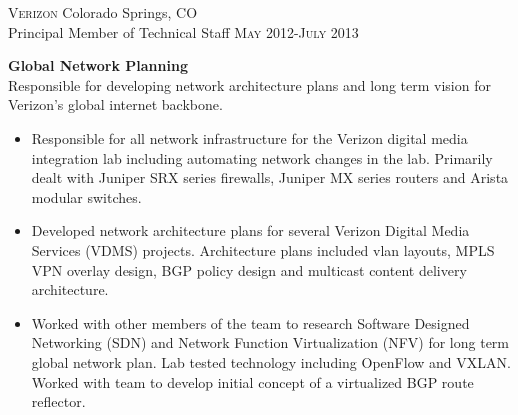 
\textsc{Verizon} \hfill Colorado Springs, CO\\
Principal Member of Technical Staff \hfill \textsc{May 2012-July 2013}

\textbf{Global Network Planning}\\
Responsible for developing network architecture plans and long term
vision for Verizon’s global internet backbone.

\begin{itemize}
\item
Responsible for all network infrastructure for the Verizon digital media
integration lab including automating network changes in the lab.  Primarily
dealt with Juniper SRX series firewalls, Juniper MX series routers and
Arista modular switches.

\item
Developed network architecture plans for several Verizon Digital Media Services
(VDMS) projects.  Architecture plans included vlan layouts, MPLS VPN overlay
design, BGP policy design and multicast content delivery architecture.

\item
Worked with other members of the team to research Software Designed Networking
(SDN) and Network Function Virtualization (NFV) for long term global network
plan.  Lab tested technology including OpenFlow and VXLAN.  Worked with team
to develop initial concept of a virtualized BGP route reflector.

\end{itemize}

